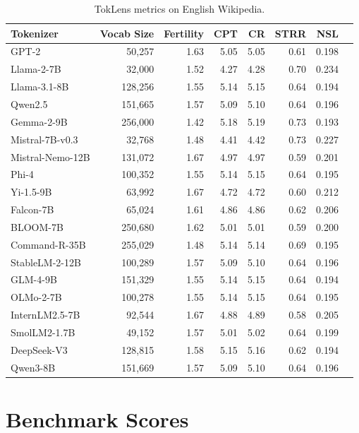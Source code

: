 \documentclass[11pt]{article}
\begin{document}
\begin{table}[H]
\centering
\small
\begin{tabular}{lrrrrrrr}
\toprule
\textbf{Tokenizer} & \textbf{Vocab Size} & \textbf{Fertility} & \textbf{CPT} & \textbf{CR} & \textbf{STRR} & \textbf{NSL} \\
\midrule
GPT-2 & 50,257 & 1.63 & 5.05 & 5.05 & 0.61 & 0.198 \\
Llama-2-7B & 32,000 & 1.52 & 4.27 & 4.28 & 0.70 & 0.234 \\
Llama-3.1-8B & 128,256 & 1.55 & 5.14 & 5.15 & 0.64 & 0.194 \\
Qwen2.5 & 151,665 & 1.57 & 5.09 & 5.10 & 0.64 & 0.196 \\
Gemma-2-9B & 256,000 & 1.42 & 5.18 & 5.19 & 0.73 & 0.193 \\
Mistral-7B-v0.3 & 32,768 & 1.48 & 4.41 & 4.42 & 0.73 & 0.227 \\
Mistral-Nemo-12B & 131,072 & 1.67 & 4.97 & 4.97 & 0.59 & 0.201 \\
Phi-4 & 100,352 & 1.55 & 5.14 & 5.15 & 0.64 & 0.195 \\
Yi-1.5-9B & 63,992 & 1.67 & 4.72 & 4.72 & 0.60 & 0.212 \\
Falcon-7B & 65,024 & 1.61 & 4.86 & 4.86 & 0.62 & 0.206 \\
BLOOM-7B & 250,680 & 1.62 & 5.01 & 5.01 & 0.59 & 0.200 \\
Command-R-35B & 255,029 & 1.48 & 5.14 & 5.14 & 0.69 & 0.195 \\
StableLM-2-12B & 100,289 & 1.57 & 5.09 & 5.10 & 0.64 & 0.196 \\
GLM-4-9B & 151,329 & 1.55 & 5.14 & 5.15 & 0.64 & 0.194 \\
OLMo-2-7B & 100,278 & 1.55 & 5.14 & 5.15 & 0.64 & 0.195 \\
InternLM2.5-7B & 92,544 & 1.67 & 4.88 & 4.89 & 0.58 & 0.205 \\
SmolLM2-1.7B & 49,152 & 1.57 & 5.01 & 5.02 & 0.64 & 0.199 \\
DeepSeek-V3 & 128,815 & 1.58 & 5.15 & 5.16 & 0.62 & 0.194 \\
Qwen3-8B & 151,669 & 1.57 & 5.09 & 5.10 & 0.64 & 0.196 \\
\bottomrule
\end{tabular}
\caption{TokLens metrics on English Wikipedia.}
\label{tab:english_metrics}
\end{table}

\section{Benchmark Scores}
\label{app:benchmarks}
\end{document}
